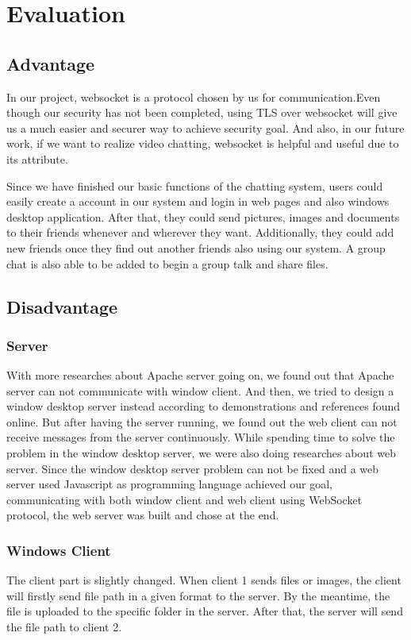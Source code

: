 \documentclass[a4paper,11pt]{article}
\begin{document}
\section{Evaluation}


\subsection{Advantage}
In our project, websocket is a protocol chosen by us for communication.Even though our security has not been completed, using TLS over websocket will give us a much easier and securer way to achieve security goal. And also, in our future work, if we want to realize video chatting, websocket is helpful and useful due to its attribute. 

Since we have finished our basic functions of the chatting system, users could easily create a account in our system and login in web pages and also windows desktop application. After that, they could send pictures, images and documents to their friends whenever and wherever they want. Additionally, they could add new friends once they find out another friends also using our system. A group chat is also able to be added to begin a group talk and share files.  

\subsection{Disadvantage}
 
\subsubsection{Server}

With more researches about Apache server going on, we found out that Apache server can not communicate with window client. And then, we tried to design a window desktop server instead according to demonstrations and references found online. But after having the server running, we found out the web client can not receive messages from the server continuously. While spending time to solve the problem in the window desktop server, we were also doing researches about web server.   Since the window desktop server problem can not be fixed and a web server used Javascript as programming language achieved our goal, communicating with both window client and web client using WebSocket protocol, the web server was built and chose at the end.  

 
\subsubsection{Windows Client}
The client part is slightly changed. When client 1 sends files or images, the client will firstly send file path in a given format to the server. By the meantime, the file is uploaded to the specific folder in the server. After that, the server will send the file path to client 2.
\end{document}

